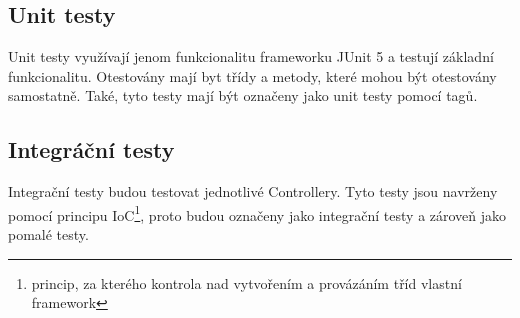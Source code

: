     \subsection{Unit testy}
        Unit testy využívají jenom funkcionalitu frameworku JUnit 5 a testují základní funkcionalitu. Otestovány mají byt třídy a metody, které mohou být otestovány samostatně. Také, tyto testy mají být označeny jako unit testy pomocí tagů.  %
    \subsection{Integráční testy}
        Integrační testy budou testovat jednotlivé Controllery. Tyto testy jsou navrženy pomocí principu IoC\footnote{princip, za kterého kontrola nad vytvořením a provázáním tříd vlastní framework}, proto budou označeny jako integrační testy a zároveň jako pomalé testy.